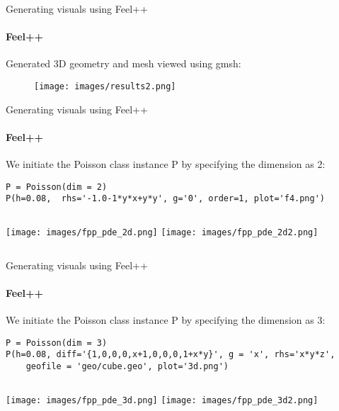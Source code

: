 \documentclass{beamer}
\begin{document}
\begin{frame}[fragile]{Generating visuals using Feel++}
\framesubtitle{Feel++}

Generated 3D geometry and mesh viewed using gmsh:
\begin{figure}
    \centering
    \texttt{[image: images/results2.png]} 
    \label{3D mesh}
\end{figure}
\end{frame}



\begin{frame}[fragile]{Generating visuals using Feel++}
\framesubtitle{Feel++}
 We initiate the Poisson class instance P by specifying the dimension as 2:
\begin{lstlisting}
P = Poisson(dim = 2)
P(h=0.08,  rhs='-1.0-1*y*x+y*y', g='0', order=1, plot='f4.png')
\end{lstlisting}
\vspace*{-0.15cm}

\begin{columns}
\centering
\texttt{[image: images/fpp\_pde\_2d.png]}
\centering
\texttt{[image: images/fpp\_pde\_2d2.png]}
\end{columns}
\end{frame}

\begin{frame}[fragile]{Generating visuals using Feel++}
\framesubtitle{Feel++}

 We initiate the Poisson class instance P by specifying the dimension as 3:
\begin{lstlisting}
P = Poisson(dim = 3)
P(h=0.08, diff='{1,0,0,0,x+1,0,0,0,1+x*y}', g = 'x', rhs='x*y*z', 
    geofile = 'geo/cube.geo', plot='3d.png')

\end{lstlisting}
\vspace*{-0.15cm}

\begin{columns}
\centering
\texttt{[image: images/fpp\_pde\_3d.png]}
\centering
\texttt{[image: images/fpp\_pde\_3d2.png]}
\end{columns}
\end{frame}
\end{document}
